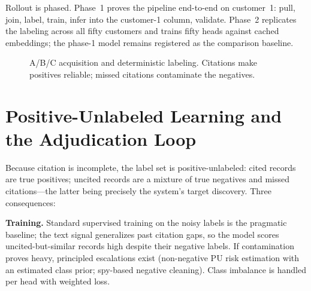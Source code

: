 \documentclass[conference]{IEEEtran}
\begin{document}
Rollout is phased. Phase~1 proves the pipeline end-to-end on customer~1: pull, join, label, train, infer into the customer-1 column, validate. Phase~2 replicates the labeling across all fifty customers and trains fifty heads against cached embeddings; the phase-1 model remains registered as the comparison baseline.

\begin{figure}[t]
\centering
{}
\caption{A/B/C acquisition and deterministic labeling. Citations make positives reliable; missed citations contaminate the negatives.}
\label{fig:abc}
\end{figure}

\section{Positive-Unlabeled Learning and the Adjudication Loop}
\label{sec:pu}
Because citation is incomplete, the label set is positive-unlabeled: cited records are true positives; uncited records are a mixture of true negatives and missed citations---the latter being precisely the system's target discovery. Three consequences:

\textbf{Training.} Standard supervised training on the noisy labels is the pragmatic baseline; the text signal generalizes past citation gaps, so the model scores uncited-but-similar records high despite their negative labels. If contamination proves heavy, principled escalations exist (non-negative PU risk estimation with an estimated class prior; spy-based negative cleaning). Class imbalance is handled per head with weighted loss.
\end{document}
